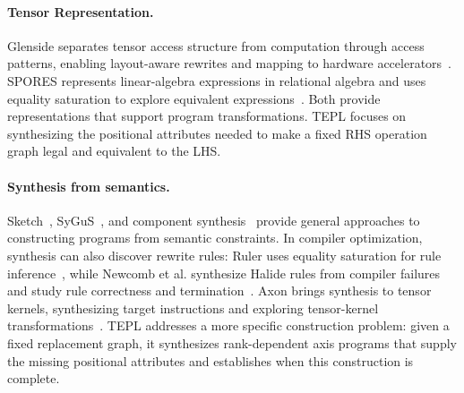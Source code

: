 \paragraph{Tensor Representation.}
Glenside separates tensor access structure from computation through access
patterns, enabling layout-aware rewrites and mapping to hardware
accelerators~\cite{glenside}. SPORES represents linear-algebra expressions
in relational algebra and uses equality saturation to explore equivalent
expressions~\cite{spores}. Both provide representations that support
program transformations. TEPL focuses on synthesizing the positional
attributes needed to make a fixed RHS operation graph legal and equivalent
to the LHS.

\paragraph{Synthesis from semantics.}
Sketch~\cite{sketch}, SyGuS~\cite{sygus}, and component
synthesis~\cite{loop-free-synthesis} provide general approaches to
constructing programs from semantic constraints. In compiler optimization,
synthesis can also discover rewrite rules: Ruler uses equality saturation
for rule inference~\cite{ruler}, while Newcomb et al. synthesize Halide
rules from compiler failures and study rule correctness and
termination~\cite{halide-rules}. Axon brings synthesis to tensor kernels,
synthesizing target instructions and exploring
tensor-kernel transformations~\cite{axon}. TEPL addresses a more specific
construction problem: given a fixed replacement graph, it synthesizes
rank-dependent axis programs that supply the missing positional
attributes and establishes when this construction is complete.
